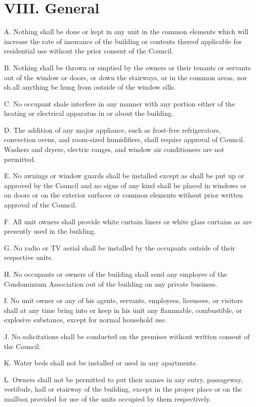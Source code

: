 \documentclass[
]{book}
\begin{document}
\hypertarget{viii.-general-2}{%
\section*{VIII. General}\label{viii.-general-2}}

A. Nothing shall be done or kept in any unit in the common elements which will increase the rate of insurance of the building or contents thereof applicable for residential use without the prior consent of the Council.

B. Nothing shall be thrown or emptied by the owners or their tenants or servants out of the window or doors, or down the stairways, or in the common areas, nor sh.all anything be hung from outside of the window sills.

C. No occupant shale interfere in any manner with any portion either of the heating or electrical apparatus in or about the building.

D. The addition of any major appliance, such as frost-free refrigerators, convection ovens, and room-sized humidifiers, shall require approval of Council. Washers and dryers, electric ranges, and window air conditioners are not permitted.

E. No awnings or window guards shall be installed except as shall be put up or approved by the Council and no signs of any kind shall be placed in windows or on doors or on the exterior surfaces or common elements without prior written approval of the Council.

F. All unit owners shall provide white curtain liners or white glass curtains as are presently used in the building.

G. No radio or TV aerial shall be installed by the occupants outside of their respective units.

H. No occupants or owners of the building shall send any employee of the Condominium Association out of the building on any private business.

I. No unit owner or any of his agents, servants, employees, licensees, or visitors shall at any time bring into or keep in his unit any flammable, combustible, or explosive substance, except for normal household use.

J. No solicitations shall be conducted on the premises without written consent of the Council.

K. Water beds shall not be installed or used in any apartments.

L. Owners shall not be permitted to put their names in any entry, passageway, vestibule, hall or stairway of the building, except in the proper place or on the mailbox provided for use of the units occupied by them respectively.
\end{document}
